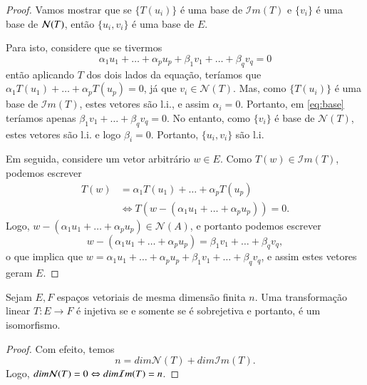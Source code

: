 \begin{proof}
Vamos mostrar que se $\{T(u_i)\}$ é uma base de ${\mathcal{I}}m(T)$ e $\{v_i\}$ é uma base de ${\cal{N}}(T)$, então $\{ u_i,v_i\}$ é uma base de $E$.

Para isto, considere que se tivermos
\begin{equation}
    \label{eq:base}
    \alpha_1u_1+\ldots+\alpha_pu_p+\beta_1v_1+\ldots+\beta_qv_q=0
\end{equation}
então aplicando $T$ dos dois lados da equação, teríamos que $\alpha_1T(u_1)+\ldots+\alpha_pT(u_p)=0$, já que $v_i \in {\mathcal{N}}(T)$. Mas, como $\{T(u_i)\}$ é uma base de ${\mathcal{I}}m(T)$, estes vetores são l.i., e assim $\alpha_i=0$. Portanto, em \eqref{eq:base} teríamos apenas $\beta_1v_1+\ldots+\beta_qv_q=0$. No entanto, como $\{ v_i\}$ é base de ${\mathcal{N}}(T)$, estes vetores são l.i. e logo $\beta_i=0$. Portanto, $\{ u_i,v_i\}$ são l.i. 

Em seguida, considere um vetor arbitrário $w\in E$. Como $T(w)\in {\mathcal{I}}m(T)$, podemos escrever
\begin{align*}
    T(w) &= \alpha_1T(u_1)+\ldots+\alpha_pT(u_p) \\
    &\Leftrightarrow T(w-(\alpha_1u_1+\ldots+\alpha_pu_p))=0.
\end{align*}
Logo, $w-(\alpha_1u_1+\ldots+\alpha_pu_p) \in {\mathcal{N}}(A)$, e portanto podemos escrever
\begin{equation*}
    w-(\alpha_1u_1+\ldots+\alpha_pu_p) = \beta_1v_1+\ldots+\beta_qv_q,
\end{equation*}
o que implica que $w=\alpha_1u_1+\ldots+\alpha_pu_p+\beta_1v_1+\ldots+\beta_qv_q$, e assim estes vetores geram $E$.
\end{proof}

\begin{coro}
    Sejam $E,F$ espaços vetoriais de mesma dimensão finita $n$. Uma transformação linear $T:E\rightarrow F$ é injetiva se e somente se é sobrejetiva e portanto, é um isomorfismo.
\end{coro}
\begin{proof}
Com efeito, temos 
\begin{equation*}
   n=dim{\mathcal{N}}(T) + dim{\mathcal{I}}m(T).
\end{equation*}
Logo, $dim{\cal{N}}(T)=0 \Leftrightarrow dim{\mathcal{I}}m(T)=n$.
\end{proof}

